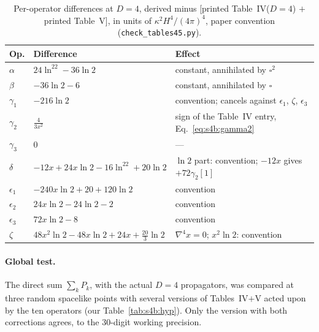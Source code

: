 \documentclass[aps,prd,onecolumn,10pt,nofootinbib,floatfix]{revtex4-2}
\begin{document}
\begin{table}[tb]
\caption{Per-operator differences at $D=4$, derived minus [printed Table~IV($D=4$) $+$ printed Table~V], in units of
$\kappa^2H^4/(4\pi)^4$, paper convention (\texttt{check\_tables45.py}).}
\label{tab:s4b:Vdiff}
\renewcommand{\arraystretch}{1.35}
\begin{ruledtabular}
\begin{tabular}{@{}lll@{}}
Op. & Difference & Effect\\
\hline
$\alpha$ & $24\ln^22-36\ln2$ & constant, annihilated by $\square^2$\\
$\beta$ & $-36\ln2-6$ & constant, annihilated by $\square$\\
$\gamma_1$ & $-216\ln2$ & convention; cancels against $\epsilon_1$, $\zeta$, $\epsilon_3$\\
$\gamma_2$ & $\frac{4}{3x^2}$ & sign of the Table~IV entry, Eq.~\eqref{eq:s4b:gamma2}\\
$\gamma_3$ & $0$ & ---\\
$\delta$ & $-12x+24x\ln2-16\ln^22+20\ln2$ & $\ln2$ part: convention; $-12x$ gives $+72\gamma_2[1]$\\
$\epsilon_1$ & $-240x\ln2+20+120\ln2$ & convention\\
$\epsilon_2$ & $24x\ln2-24\ln2-2$ & convention\\
$\epsilon_3$ & $72x\ln2-8$ & convention\\
$\zeta$ & $48x^2\ln2-48x\ln2+24x+\frac{20}{3}\ln2$ & $\nabla^4x=0$; $x^2\ln2$: convention\\
\end{tabular}
\end{ruledtabular}
\end{table}

\paragraph*{Global test.}
The direct sum $\sum_kP_k$, with the actual $D=4$ propagators, was compared at three random spacelike points with
several versions of Tables~IV$+$V acted upon by the ten operators (our Table~\ref{tab:s4b:hyp}). Only the version with both
corrections agrees, to the 30-digit working precision.
\end{document}
